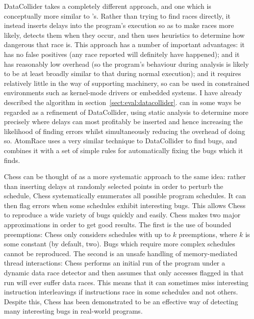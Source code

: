 DataCollider\cite{Erickson2010} takes a completely different approach,
and one which is conceptually more similar to {\technique}'s.  Rather
than trying to find races directly, it instead inserts delays into the
program's execution so as to make races more likely, detects them when
they occur, and then uses heuristics to determine how dangerous that
race is.  This approach has a number of important advantages: it has
no false positives (any race reported will definitely have happened);
and it has reasonably low overhead (so the program's behaviour during
analysis is likely to be at least broadly similar to that during
normal execution); and it requires relatively little in the way of
supporting machinery, so can be used in constrained environments such
as kernel-mode drivers or embedded systems.  I have already described
the algorithm in section~\ref{sect:eval:datacollider}.  {\Technique}
can in some ways be regarded as a refinement of DataCollider, using
static analysis to determine more precisely where delays can most
profitably be inserted and hence increasing the likelihood of finding
errors whilst simultaneously reducing the overhead of doing so.
AtomRace\cite{Letko2008} uses a very similar technique to DataCollider
to find bugs, and combines it with a set of simple rules for
automatically fixing the bugs which it finds.

Chess\cite{Musuvathi2008} can be thought of as a more systematic
approach to the same idea: rather than inserting delays at randomly
selected points in order to perturb the schedule, Chess systematically
enumerates all possible program schedules.  It can then flag errors
when some schedules exhibit interesting bugs.  This allows Chess to
reproduce a wide variety of bugs quickly and easily.  Chess makes two
major approximations in order to get good results.  The first is the
use of bounded preemptions\cite{Musuvathi2007}: Chess only considers
schedules with up to $k$ preemptions, where $k$ is some constant (by
default, two).  Bugs which require more complex schedules cannot be
reproduced.  The second is an unsafe handling of memory-mediated
thread interactions: Chess performs an initial run of the program
under a dynamic data race detector and then assumes that only accesses
flagged in that run will ever suffer data races.  This means that it
can sometimes miss interesting instruction interleavings if
instructions race in some schedules and not others.  Despite this,
Chess has been demonstrated to be an effective way of detecting many
interesting bugs in real-world programs.

